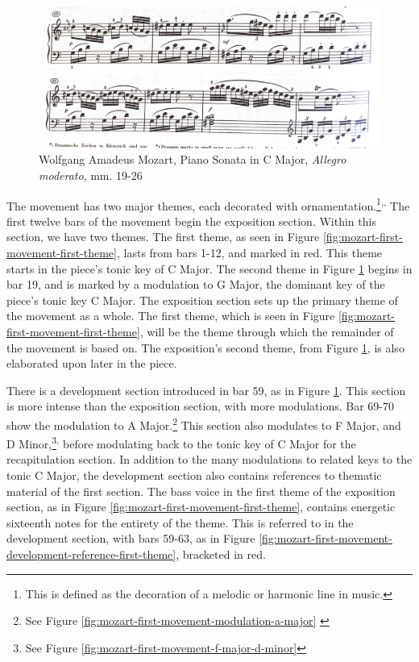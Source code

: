 \begin{figure}
    \centering
    \includegraphics[width=\textwidth]{figures/mozart-first-movement-second-theme.jpg}
    \caption{Wolfgang Amadeus Mozart, Piano Sonata in C Major, \textit{Allegro moderato}, mm. 19-26}
    \label{fig:mozart-first-movement-second-theme}
\end{figure}

The movement has two major themes, each decorated with ornamentation.\footnote{This is defined as the decoration of a melodic or harmonic line in music.}\textsuperscript{,}\autocite{Latham_2011a}\textsuperscript{,}\autocite{Burkholder_Grout_Palisca_2014} The first twelve bars of the movement begin the exposition section. Within this section, we have two themes. The first theme, as seen in Figure \ref{fig:mozart-first-movement-first-theme}\autocite{Henle_1977}, lasts from bars 1-12, and marked in red. This theme starts in the piece's tonic key of C Major. The second theme in Figure \ref{fig:mozart-first-movement-second-theme}\autocite{Henle_1977} begins in bar 19, and is marked by a modulation to G Major, the dominant key of the piece's tonic key C Major. The exposition section sets up the primary theme of the movement as a whole. The first theme, which is seen in Figure \ref{fig:mozart-first-movement-first-theme}\autocite{Henle_1977}, will be the theme through which the remainder of the movement is based on. The exposition's second theme, from Figure \ref{fig:mozart-first-movement-second-theme}\autocite{Henle_1977}, is also elaborated upon later in the piece. 

There is a development section introduced in bar 59, as in Figure \ref{fig:mozart-first-movement-second-theme}\autocite{Henle_1977}. This section is more intense than the exposition section, with more modulations. Bar 69-70 show the modulation to A Major.\footnote{See Figure \ref{fig:mozart-first-movement-modulation-a-major} \autocite{Henle_1977}} This section also modulates to F Major, and D Minor,\footnote{See Figure \ref{fig:mozart-first-movement-f-major-d-minor}}\textsuperscript{,}\autocite{Henle_1977} before modulating back to the tonic key of C Major for the recapitulation section. In addition to the many modulations to related keys to the tonic C Major, the development section also contains references to thematic material of the first section. The bass voice in the first theme of the exposition section, as in Figure \ref{fig:mozart-first-movement-first-theme}\autocite{Henle_1977}, contains energetic sixteenth notes for the entirety of the theme. This is referred to in the development section, with bars 59-63, as in Figure \ref{fig:mozart-first-movement-development-reference-first-theme}\autocite{Henle_1977}, bracketed in red. 

